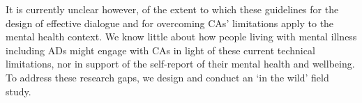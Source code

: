             It is currently unclear however, of the extent to which these guidelines for the design of effective dialogue and for overcoming \ac{CA}s' limitations apply to the mental health context. We know little about how people living with mental illness including \ac{AD}s might engage with \ac{CA}s in light of these current technical limitations, nor in support of the self-report of their mental health and wellbeing. To address these research gaps, we design and conduct an `in the wild' field study. 
            
